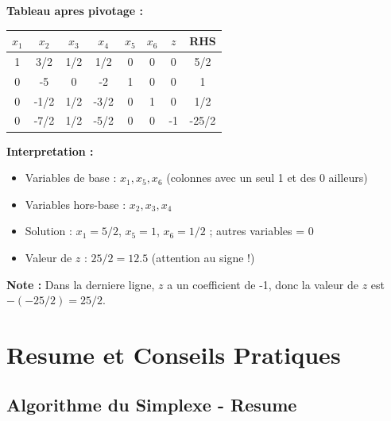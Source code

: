 \documentclass[12pt,a4paper]{article}
\begin{document}
\begin{exemple}
\textbf{Tableau apres pivotage :}

\begin{center}
\begin{tabular}{ccccccc|c}
\toprule
$x_1$ & $x_2$ & $x_3$ & $x_4$ & $x_5$ & $x_6$ & $z$ & RHS \\
\midrule
1 & 3/2 & 1/2 & 1/2 & 0 & 0 & 0 & 5/2 \\
0 & -5 & 0 & -2 & 1 & 0 & 0 & 1 \\
0 & -1/2 & 1/2 & -3/2 & 0 & 1 & 0 & 1/2 \\
\midrule
0 & -7/2 & 1/2 & -5/2 & 0 & 0 & -1 & -25/2 \\
\bottomrule
\end{tabular}
\end{center}

\textbf{Interpretation :}
\begin{itemize}
    \item Variables de base : $x_1, x_5, x_6$ (colonnes avec un seul 1 et des 0 ailleurs)
    \item Variables hors-base : $x_2, x_3, x_4$
    \item Solution : $x_1 = 5/2$, $x_5 = 1$, $x_6 = 1/2$ ; autres variables = 0
    \item Valeur de $z$ : $25/2 = 12.5$ (attention au signe !)
\end{itemize}

\textbf{Note :} Dans la derniere ligne, $z$ a un coefficient de -1, donc la valeur de $z$ est $-(-25/2) = 25/2$.
\end{exemple}

\newpage
\section{Resume et Conseils Pratiques}

\subsection{Algorithme du Simplexe - Resume}
\end{document}
